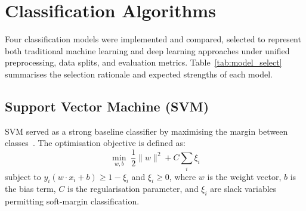 \section{Classification Algorithms}
\label{sec:algorithms}

Four classification models were implemented and compared, selected to represent both traditional machine learning and deep learning approaches under unified preprocessing, data splits, and evaluation metrics. Table~\ref{tab:model_select} summarises the selection rationale and expected strengths of each model.

\begin{table}[!htb]
\centering
\caption{Model selection rationale and expected characteristics.}
\label{tab:model_select}
\footnotesize
\setlength{\tabcolsep}{2.5pt}
\end{table}

\subsection{Support Vector Machine (SVM)}

SVM served as a strong baseline classifier by maximising the margin between classes~\citep{dzikovska2012using}. The optimisation objective is defined as:
\begin{equation}
\min_{w, b} \;\frac{1}{2}\|w\|^2 + C \sum_{i} \xi_i
\label{eq:svm}
\end{equation}
subject to $y_i(w \cdot x_i + b) \geq 1 - \xi_i$ and $\xi_i \geq 0$, where $w$ is the weight vector, $b$ is the bias term, $C$ is the regularisation parameter, and $\xi_i$ are slack variables permitting soft-margin classification.

